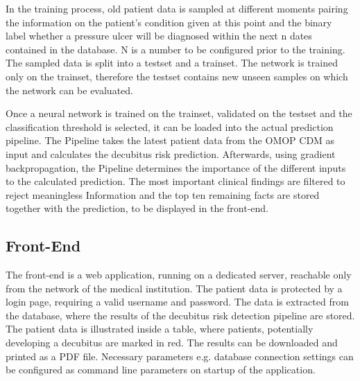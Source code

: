 In the training process, old patient data is sampled at different moments pairing the information on the patient's condition given at this point and the binary label whether a pressure ulcer will be diagnosed within the next n dates contained in the database.
N is a number to be configured prior to the training.
The sampled data is split into a testset and a trainset.
The network is trained only on the trainset, therefore the testset contains new unseen samples on which the network can be evaluated.

Once a neural network is trained on the trainset, validated on the testset and the classification threshold is selected, it can be loaded into the actual prediction pipeline.
The Pipeline takes the latest patient data from the OMOP CDM as input and calculates the decubitus risk prediction. 
Afterwards, using gradient backpropagation, the Pipeline determines the importance of the different inputs to the calculated prediction.
The most important clinical findings are filtered to reject meaningless Information and the top ten remaining facts are stored together with the prediction, to be displayed in the front-end.

\subsection{Front-End}

The front-end is a web application, running on a dedicated server, reachable only from the network of the medical institution. 
The patient data is protected by a login page, requiring a valid username and password. 
The data is extracted from the database, where the results of the decubitus risk detection pipeline are stored. 
The patient data is illustrated inside a table, where patients, potentially developing a decubitus are marked in red. 
The results can be downloaded and printed as a PDF file. 
Necessary parameters e.g. database connection settings can be configured as command line parameters on startup of the application. 